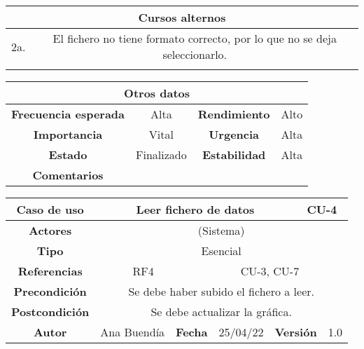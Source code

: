\begin{table}[!h]
\begin{tabular}{|c|c|}
\hline
\multicolumn{2}{|c|}{\cellcolor{cyan} \textbf{Cursos alternos}} \\
\hline
      2a.        &    El fichero no tiene formato correcto, por lo que no se deja seleccionarlo.          \\
\hline
              &              \\
\hline
\end{tabular}
\end{table}

\begin{table}[!h]
\begin{tabular}{|c|c|c|c|}
\hline
\multicolumn{4}{|c|}{\cellcolor{cyan} \textbf{Otros datos}} \\
\hline
 \cellcolor{cyan} \textbf{Frecuencia esperada}             &     Alta          &    \cellcolor{cyan} \textbf{Rendimiento}          &      Alto        \\
\hline
 \cellcolor{cyan} \textbf{Importancia}             &      Vital         &     \cellcolor{cyan} \textbf{Urgencia}         &      Alta        \\
\hline
 \cellcolor{cyan} \textbf{Estado}             &      Finalizado         &    \cellcolor{cyan} \textbf{Estabilidad}          &     Alta         \\
\hline
 \cellcolor{cyan} \textbf{Comentarios}        &  \multicolumn{3}{|c|}{} \\
\hline
\end{tabular}
\end{table}




\clearpage

\begin{table}[!h]
\begin{tabular}{|c|c|c|c|c|c|c|c|}
\hline
\rowcolor{cyan} \textbf{Caso de uso} & \multicolumn{5}{|c|}{Leer fichero de datos} & \multicolumn{2}{|c|}{CU-4} \\
\hline
\cellcolor{cyan} \textbf{Actores}              & \multicolumn{7}{|c|}{(Sistema)}           \\
\hline
\cellcolor{cyan} \textbf{Tipo}                 & \multicolumn{7}{|c|}{Esencial}             \\
\hline
\cellcolor{cyan} \textbf{Referencias}          & \multicolumn{2}{|c|}{RF4}           & \multicolumn{5}{|c|}{CU-3, CU-7}\\
\hline
\cellcolor{cyan} \textbf{Precondición}         & \multicolumn{7}{|c|}{Se debe haber subido el fichero a leer.}             \\
\hline
\cellcolor{cyan} \textbf{Postcondición}        & \multicolumn{7}{|c|}{Se debe actualizar la gráfica.}              \\
\hline
\cellcolor{cyan} \textbf{Autor}                &   Ana Buendía   & \multicolumn{2}{|c|}{\cellcolor{cyan} \textbf{Fecha}} &  25/04/22   & \multicolumn{2}{|c|}{\cellcolor{cyan} \textbf{Versión}} & 1.0  \\
\hline
\end{tabular}
\end{table}

